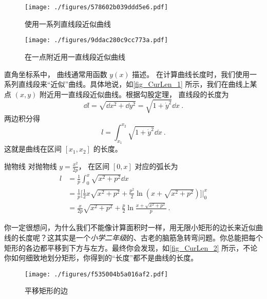 

\begin{figure}[ht]
\centering
\texttt{[image: ./figures/578602b039ddd5e6.pdf]}
\caption{使用一系列直线段近似曲线} \label{fig_CurLen_3}
\end{figure}

\begin{figure}[ht]
\centering
\texttt{[image: ./figures/9ddac280c9cc773a.pdf]}
\caption{在一点附近用一直线段近似曲线} \label{fig_CurLen_1}
\end{figure}

直角坐标系中， 曲线通常用函数 $y(x)$ 描述。 在计算曲线长度时，我们使用一系列直线段来“近似”曲线。具体地说，如\autoref{fig_CurLen_1} 所示，我们在曲线上某点 $(x, y)$ 附近用一直线段近似曲线。根据勾股定理， 直线段的长度为
\begin{equation}
\dd{l} = \sqrt{\dd{x}^2 + \dd{y}^2} = \sqrt{1 + \dot y^2} \dd{x}~.
\end{equation}
两边积分得
\begin{equation}\label{eq_CurLen_1}
l = \int_{x_1}^{x_2} \sqrt{1 + \dot y^2} \dd{x}~.
\end{equation}
这就是曲线在区间 $[x_1, x_2]$ 的长度。

\begin{example}{抛物线}
对抛物线 $y=\frac{x^2}{2p}$， 在区间 $[0,x]$ 对应的弧长为
\begin{equation}
\begin{aligned}
l& = \frac{1}{p}\int_{0}^{x}\sqrt{x^2+p^2}\dd{x}\\
&=\frac{1}{p}\bigg[\frac{1}{2}x\sqrt{x^2+p^2}+\frac{p^2}{2}\ln(x+\sqrt{x^2+p^2})\bigg]\Bigg\lvert_{0}^{x}\\
&=\frac{x}{2p}\sqrt{x^2+p^2}+\frac{p}{2}\ln\frac{x+\sqrt{x^2+p^2}}{p}~.
\end{aligned}
\end{equation}
\end{example}

你一定很想问，为什么我们不能像计算面积时一样，用无限小矩形的边长来近似曲线的长度呢？这其实是一个\textsl{小学二年级}的、古老的脑筋急转弯问题。你总能把每个矩形的各边都平移到下方与左方。最终你会发现，如\autoref{fig_CurLen_2} 所示，不论你如何细致地划分矩形，你得到的“长度”都不是曲线的长度。
\begin{figure}[ht]
\centering
\texttt{[image: ./figures/f535004b5a016af2.pdf]}
\caption{平移矩形的边} \label{fig_CurLen_2}
\end{figure}

